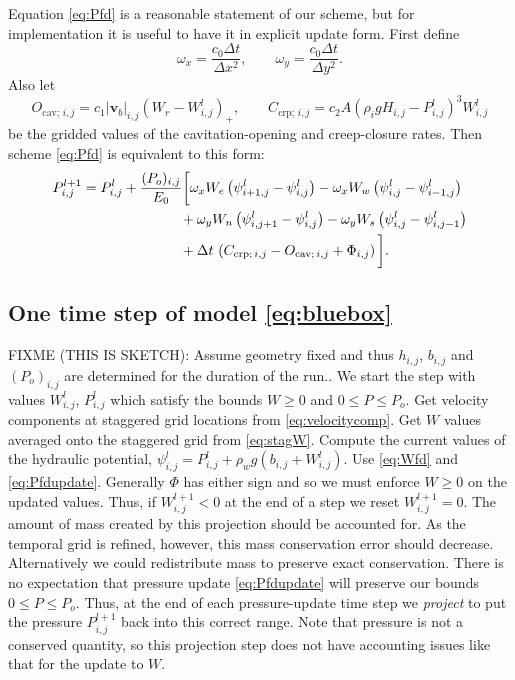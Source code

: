 \documentclass[11pt,final]{amsart}%
\newcommand\bv{\mathbf{v}}
\newcommand{\Wlij}{W^l_{i,j}}
\newcommand{\Plij}{P^l_{i,j}}
\begin{document}
Equation \eqref{eq:Pfd} is a reasonable statement of our scheme, but for implementation it is useful to have it in explicit update form.  First define
	$$\omega_x = \frac{c_0 \Delta t}{\Delta x^2}, \qquad \omega_y = \frac{c_0 \Delta t}{\Delta y^2}.$$
Also let
\newcommand{\Ocavij}{O_{\text{cav};\, i,j}}
\newcommand{\Ccrpij}{C_{\text{crp};\, i,j}}
	$$\Ocavij = c_1 |\bv_b|_{i,j} \left(W_r - \Wlij\right)_+, \qquad \Ccrpij = c_2 A \left(\rho_i g H_{i,j} - \Plij\right)^3 \Wlij$$
be the gridded values of the cavitation-opening and creep-closure rates.  Then scheme \eqref{eq:Pfd} is equivalent to this form:
\begin{align}
P_{i,j}^{l+1} &= \Plij +  \frac{(P_o)_{i,j}}{E_0} \bigg[\omega_x W_e \left(\psi_{i+1,j}^l - \psi_{i,j}^l\right) - \omega_x W_w \left(\psi_{i,j}^l - \psi_{i-1,j}^l\right) \label{eq:Pfdupdate} \\
      &\qquad\qquad\qquad\quad + \omega_y W_n \left(\psi_{i,j+1}^l - \psi_{i,j}^l\right) - \omega_y W_s \left(\psi_{i,j}^l - \psi_{i,j-1}^l\right) \notag \\
      &\qquad\qquad\qquad\quad + \Delta t\, \left(\Ccrpij - \Ocavij + \Phi_{i,j}\right)\bigg]. \notag
\end{align}

\subsection*{One time step of model \eqref{eq:bluebox}}  FIXME (THIS IS SKETCH):  Assume geometry fixed and thus $h_{i,j}$, $b_{i,j}$ and $(P_o)_{i,j}$ are determined for the duration of the run..  We start the step with values $\Wlij$, $\Plij$ which satisfy the bounds $W\ge 0$ and $0 \le P \le P_o$.  Get velocity components at staggered grid locations from \eqref{eq:velocitycomp}.  Get $W$ values averaged onto the staggered grid from \eqref{eq:stagW}.  Compute the current values of the hydraulic potential, $\psi_{i,j}^l = \Plij + \rho_w g(b_{i,j} + \Wlij)$.  Use \eqref{eq:Wfd} and \eqref{eq:Pfdupdate}.  Generally $\Phi$ has either sign and so we must enforce $W\ge 0$ on the updated values.  Thus, if $W_{i,j}^{l+1}<0$ at the end of a step we reset $W_{i,j}^{l+1}=0$.  The amount of mass created by this projection should be accounted for.  As the temporal grid is refined, however, this mass conservation error should decrease.  Alternatively we could redistribute mass to preserve exact conservation.  There is no expectation that pressure update \eqref{eq:Pfdupdate} will preserve our bounds $0\le P \le P_o$.  Thus, at the end of each pressure-update time step we \emph{project} to put the pressure $P_{i,j}^{l+1}$ back into this correct range.  Note that pressure is not a conserved quantity, so this projection step does not have accounting issues like that for the update to $W$.
\end{document}

